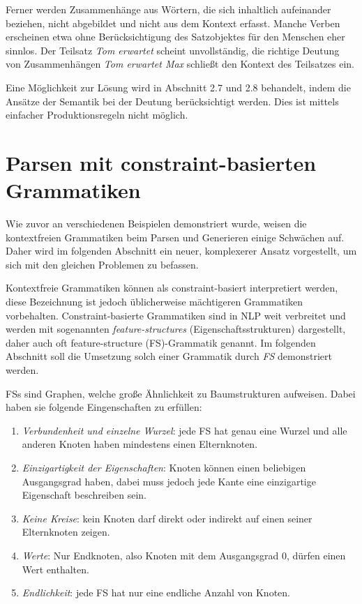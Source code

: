 \documentclass[12pt]{report}
\begin{document}
Ferner werden Zusammenhänge aus Wörtern, die sich inhaltlich aufeinander beziehen, nicht abgebildet und nicht aus dem Kontext erfasst. Manche Verben erscheinen etwa ohne Berücksichtigung des Satzobjektes für den Menschen eher sinnlos. Der Teilsatz \textit{\glqq  Tom erwartet\grqq{}} scheint unvollständig, die richtige Deutung von Zusammenhängen \textit{\glqq  Tom erwartet Max\grqq{}} schließt den Kontext des Teilsatzes ein.

Eine Möglichkeit zur Lösung wird in Abschnitt 2.7 und 2.8 behandelt, indem die Ansätze der Semantik bei der Deutung berücksichtigt werden. Dies ist mittels einfacher Produktionsregeln nicht möglich.

\section[Parsen mit CBGs]{Parsen mit constraint-basierten \\Grammatiken}
Wie zuvor an verschiedenen Beispielen demonstriert wurde, weisen die kontextfreien Grammatiken beim Parsen und Generieren einige Schwächen auf. Daher wird im folgenden Abschnitt ein neuer, komplexerer Ansatz vorgestellt, um sich mit den gleichen Problemen zu befassen. 

Kontextfreie Grammatiken können als constraint-basiert interpretiert werden, diese Bezeichnung ist jedoch üblicherweise mächtigeren Grammatiken vorbehalten. Constraint-basierte Grammatiken sind in NLP weit verbreitet und werden mit sogenannten \textit{feature-structures} (Eigenschaftsstrukturen) dargestellt, daher auch oft feature-structure (FS)-Grammatik genannt. Im folgenden Abschnitt soll die Umsetzung solch einer Grammatik durch \textit{FS} demonstriert werden.

FSs sind Graphen, welche große Ähnlichkeit zu Baumstrukturen aufweisen. Dabei haben sie folgende Eingenschaften zu erfüllen:

\begin{enumerate}
\item \textit{Verbundenheit und einzelne Wurzel}: jede FS hat genau eine Wurzel und alle anderen Knoten haben mindestens einen Elternknoten.
\item \textit{Einzigartigkeit der Eigenschaften}: Knoten können einen beliebigen Ausgangsgrad haben, dabei muss jedoch jede Kante eine einzigartige Eigenschaft beschreiben sein.
\item \textit{Keine Kreise}: kein Knoten darf direkt oder indirekt auf einen seiner Elternknoten zeigen. 
\item \textit{Werte}: Nur Endknoten, also Knoten mit dem Ausgangsgrad 0, dürfen einen Wert enthalten. 
\item \textit{Endlichkeit}: jede FS hat nur eine endliche Anzahl von Knoten.
\end{enumerate}
\end{document}
